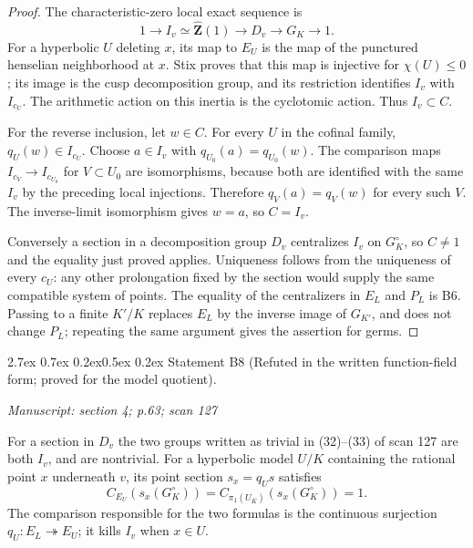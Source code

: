 \documentclass[11pt,a4paper]{article}
\makeatletter
\newcommand{\passage}[1]{\par\smallskip\noindent\textit{Manuscript: #1}\par\smallskip}
\renewcommand\paragraph{\@startsection{paragraph}{4}{\z@}%
  {2.7ex \@plus 0.7ex \@minus 0.2ex}{0.5ex \@plus 0.2ex}%
  {\normalfont\normalsize\bfseries}}
\makeatother
\begin{document}
\begin{proof}
The characteristic-zero local exact sequence is
\[
 1\longrightarrow I_v\simeq\widehat{\mathbf Z}(1)
 \longrightarrow D_v\longrightarrow G_K\longrightarrow1.
\]
For a hyperbolic $U$ deleting $x$, its map to $E_U$ is the map of the
punctured henselian neighborhood at $x$. Stix
\cite[Lemma 10]{B_Stix2008} proves that this map is injective for
$\chi(U)\le0$; its image is the cusp decomposition group, and its
restriction identifies $I_v$ with $I_{c_U}$. The arithmetic action on this
inertia is the cyclotomic action. Thus $I_v\subset C$.

For the reverse inclusion, let $w\in C$. For every $U$ in the cofinal
family, $q_U(w)\in I_{c_U}$. Choose $a\in I_v$ with
$q_{U_0}(a)=q_{U_0}(w)$. The comparison maps
$I_{c_V}\to I_{c_{U_0}}$ for $V\subset U_0$ are isomorphisms, because
both are identified with the same $I_v$ by the preceding local
injections. Therefore $q_V(a)=q_V(w)$ for every such $V$. The inverse-limit
isomorphism gives $w=a$, so $C=I_v$.

Conversely a section in a decomposition group $D_v$ centralizes $I_v$
on $G_K^\circ$, so $C\ne1$ and the equality just proved applies.
Uniqueness follows from the uniqueness of every $c_U$: any other
prolongation fixed by the section would supply the same compatible
system of points. The equality of the centralizers in $E_L$ and $P_L$
is B6. Passing to a finite $K'/K$ replaces $E_L$ by the inverse image of
$G_{K'}$, and does not change $P_L$; repeating the same argument gives
the assertion for germs.
\end{proof}

\paragraph{Statement B8 (Refuted in the written function-field form;
proved for the model quotient).}\label{res:B8}
\passage{section 4; p.63; scan 127}

For a section in $D_v$ the two groups written as trivial in (32)--(33)
of scan 127 are both $I_v$, and are nontrivial. For a hyperbolic model
$U/K$ containing the rational point $x$ underneath $v$, its point section
$s_x=q_Us$ satisfies
\[
 C_{E_U}(s_x(G_K^\circ))
 =C_{\pi_1(U_{\overline K})}(s_x(G_K^\circ))=1.
\]
The comparison responsible for the two formulas is the continuous
surjection $q_U:E_L\twoheadrightarrow E_U$; it kills $I_v$ when $x\in U$.
\end{document}
